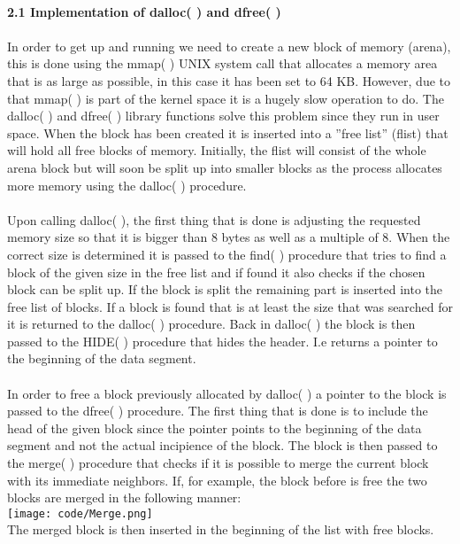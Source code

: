 \documentclass[a4paper,10pt]{article}
\begin{document}
\maketitle
\textbf
{\\2.1 Implementation of dalloc( ) and dfree( )\\\\}
In order to get up and running we need to create a new block of memory (arena), this is done using the mmap( ) UNIX system call that allocates a memory area that is as large as possible,  in this case it has been set to 64 KB. However, due to that mmap( ) is part of the kernel space it is a hugely slow operation to do. The dalloc( ) and dfree( ) library functions solve this problem since they run in user space. When the block has been created it is inserted into a ”free list” (flist) that will hold all free blocks of memory. Initially, the flist will consist of the whole arena block but will soon be split up into smaller blocks as the process allocates more memory using the dalloc( ) procedure.
\\\\Upon calling dalloc( ), the first thing that is done is adjusting the requested memory size so that it is bigger than 8 bytes as well as a multiple of 8. When the correct size is determined it is passed to the find( ) procedure that tries to find a block of the given size in the free list and if found it also checks if the chosen block can be split up. If the block is split the remaining part is inserted into the free list of blocks. If a block is found that is at least the size that was searched for it is returned to the dalloc( ) procedure. Back in dalloc( ) the block is then passed to the HIDE( ) procedure that hides the header. I.e returns a pointer to the beginning of the data segment.
\\\\In order to free a block previously allocated by dalloc( ) a pointer to the block is passed to the dfree( ) procedure. The first thing that is done is to include the head of the given block since the pointer points to the beginning of the data segment and not the actual incipience of the block. The block is then passed to the merge( ) procedure that checks if it is possible to merge the current block with its immediate neighbors. If, for example, the block before is free the two blocks are merged in the following manner: \\

\texttt{[image: code/Merge.png]}\\The merged block is then inserted in the beginning of the list with free blocks.
\end{document}
